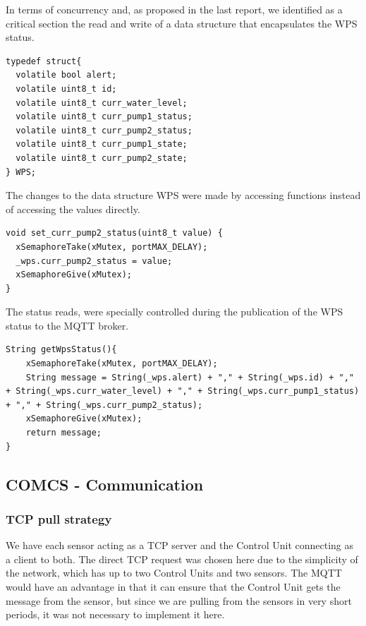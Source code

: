 \documentclass[11pt]{article}
\begin{document}
In terms of concurrency and, as proposed in the last report, we identified as a critical section the read and write of a data structure that encapsulates the WPS status.

\begin{verbatim}
typedef struct{
  volatile bool alert;
  volatile uint8_t id;
  volatile uint8_t curr_water_level;
  volatile uint8_t curr_pump1_status;
  volatile uint8_t curr_pump2_status;  
  volatile uint8_t curr_pump1_state;
  volatile uint8_t curr_pump2_state;
} WPS;
\end{verbatim}

The changes to the data structure WPS were made by accessing functions instead of accessing the values directly.

\begin{verbatim}
void set_curr_pump2_status(uint8_t value) {
  xSemaphoreTake(xMutex, portMAX_DELAY);
  _wps.curr_pump2_status = value;
  xSemaphoreGive(xMutex);
}
\end{verbatim}

The status reads, were specially controlled during the publication of the WPS status to the MQTT broker.

\begin{verbatim}
String getWpsStatus(){
    xSemaphoreTake(xMutex, portMAX_DELAY);
    String message = String(_wps.alert) + "," + String(_wps.id) + "," + String(_wps.curr_water_level) + "," + String(_wps.curr_pump1_status) + "," + String(_wps.curr_pump2_status);
    xSemaphoreGive(xMutex);
    return message;
}
\end{verbatim}

\subsection{COMCS - Communication}

\subsubsection{TCP pull strategy}

We have each sensor acting as a TCP server and the Control Unit connecting as a client to both.
The direct TCP request was chosen here due to the simplicity of the network, which has up to two Control Units and two sensors. The MQTT would have an advantage in that it can ensure that the Control Unit gets the message from the sensor, but since we are pulling from the sensors in very short periods, it was not necessary to implement it here.
\end{document}
